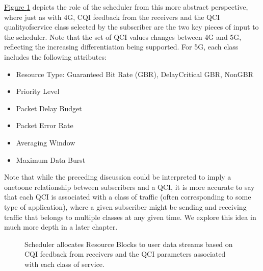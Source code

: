 \documentclass[a4paper,11pt,english]{sphinxmanual}
\let\sphinxpxdimen\pdfpxdimen\else\newdimen\sphinxpxdimen
\begin{document}
\sphinxAtStartPar
\hyperref[\detokenize{primer:fig-scheduler}]{Figure \ref{\detokenize{primer:fig-scheduler}}} depicts the role of the scheduler
from this more abstract perspective, where just as with 4G, CQI
feedback from the receivers and the QCI quality\sphinxhyphen{}of\sphinxhyphen{}service class
selected by the subscriber are the two key pieces of input to the
scheduler. Note that the set of QCI values changes between 4G and 5G,
reflecting the increasing differentiation being supported. For 5G,
each class includes the following attributes:
\begin{itemize}
\item {} 
\sphinxAtStartPar
Resource Type: Guaranteed Bit Rate (GBR), Delay\sphinxhyphen{}Critical GBR, Non\sphinxhyphen{}GBR

\item {} 
\sphinxAtStartPar
Priority Level

\item {} 
\sphinxAtStartPar
Packet Delay Budget

\item {} 
\sphinxAtStartPar
Packet Error Rate

\item {} 
\sphinxAtStartPar
Averaging Window

\item {} 
\sphinxAtStartPar
Maximum Data Burst

\end{itemize}

\sphinxAtStartPar
Note that while the preceding discussion could be interpreted to imply a
one\sphinxhyphen{}to\sphinxhyphen{}one relationship between subscribers and a QCI, it is more
accurate to say that each QCI is associated with a class of traffic
(often corresponding to some type of application), where a given
subscriber might be sending and receiving traffic that belongs to
multiple classes at any given time. We explore this idea in much more
depth in a later chapter.

\begin{figure}[ht]
\centering
\capstart

\noindent\sphinxincludegraphics[width=600\sphinxpxdimen]{{Slide13}.png}
\caption{Scheduler allocates Resource Blocks to user data streams based on
CQI feedback from receivers and the QCI parameters associated with
each class of service.}\label{\detokenize{primer:id9}}\label{\detokenize{primer:fig-scheduler}}\end{figure}
\end{document}
